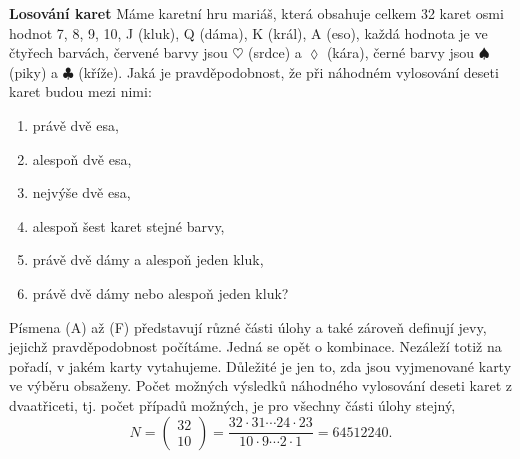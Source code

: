 \wikitextrule
\begin{example}\label{mai:exam053}
  \textbf{Losování karet}\newline\small
    Máme karetní hru mariáš, která obsahuje celkem \num{32} karet osmi hodnot \num{7}, \num{8}, 
    \num{9}, \num{10}, J (kluk), Q (dáma), K (král), A (eso), každá hodnota je ve čtyřech barvách, 
    červené barvy jsou \(\heartsuit\) (srdce) a \(\lozenge\) (kára), černé barvy jsou \(\spadesuit\)
    (piky) a \(\clubsuit\) (kříže). Jaká je pravděpodobnost, že při náhodném vylosování deseti 
    karet budou 
    mezi nimi:
    \begin{enumerate}[label=\Alph*]
      \item právě dvě esa,
      \item alespoň dvě esa,
      \item nejvýše dvě esa,
      \item alespoň šest karet stejné barvy,
      \item právě dvě dámy a alespoň jeden kluk,
      \item právě dvě dámy nebo alespoň jeden kluk?
    \end{enumerate}

    Písmena (A) až (F) představují různé části úlohy a také zároveň definují jevy, jejichž 
    pravděpodobnost počítáme. Jedná se opět o kombinace. Nezáleží totiž na pořadí, v jakém karty 
    vytahujeme. Důležité je jen to, zda jsou vyjmenované karty ve výběru obsaženy. Počet možných 
    výsledků náhodného vylosování deseti karet z dvaatřiceti, tj. počet případů možných, je pro 
    všechny části úlohy stejný,
    \begin{equation*}
      N = \begin{pmatrix} 32 \\ 10\end{pmatrix} 
        = \dfrac{32\cdot31\cdots24\cdot23}{10\cdot9\cdots2\cdot1} = \num{64512240}.
    \end{equation*}
    

\end{example}
